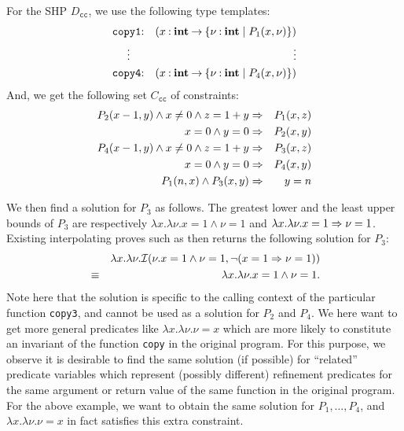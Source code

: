 For the SHP \(D_{\texttt{cc}}\), we use the following type templates:
\begin{eqnarray*}
\texttt{copy1}&\mathbin{:}&(x\mathbin{:}{\mathbf{int}}\mathbin{\rightarrow}{\{{\nu\mathbin{:}\mathbf{int} \mid P_1(x,\nu)}\}}) \\
\vdots\quad &&\qquad\qquad \vdots \\
\texttt{copy4}&\mathbin{:}&(x\mathbin{:}{\mathbf{int}}\mathbin{\rightarrow}{\{{\nu\mathbin{:}\mathbf{int} \mid P_4(x,\nu)}\}})
\end{eqnarray*}
And, we get the following set \(C_{\texttt{cc}}\) of constraints:
\begin{eqnarray*}
P_2(x-1,y) \land x\neq0 \land z=1+y &\Rightarrow& P_1(x,z) \\
x=0 \land y=0 &\Rightarrow& P_2(x,y) \\
P_4(x-1,y) \land x\neq0 \land z=1+y &\Rightarrow& P_3(x,z) \\
x=0 \land y=0 &\Rightarrow& P_4(x,y) \\
P_1(n,x) \land P_3(x,y) &\Rightarrow& y=n
\end{eqnarray*}

We then find a solution for \(P_3\) as follows.  The greatest lower and 
the least upper bounds of \(P_3\) are respectively \(\lambda x.\lambda 
\nu.x=1 \land \nu=1\) and \(\lambda x.\lambda \nu.x=1 \Rightarrow \nu=1\).
%
Existing interpolating proves such as \cite{Beyer2008} then returns the 
following solution for \(P_3\):
\begin{eqnarray*}
&&\lambda x.\lambda \nu.\mathcal{I}(\nu.x=1 \land \nu=1,\neg (x=1 \Rightarrow \nu=1)) \\
&\equiv& \lambda x.\lambda \nu.x=1 \land \nu=1.
\end{eqnarray*}
Note here that the solution is specific to the calling context of the 
particular function \texttt{copy3}, and cannot be used as a solution for 
\(P_2\) and \(P_4\).  We here want to get more general predicates like 
\(\lambda x.\lambda \nu.\nu=x\) which are more likely to constitute an invariant 
of the function \texttt{copy} in the original program.  For this purpose, 
we observe it is desirable to find the same solution (if possible) for 
``related'' predicate variables which represent (possibly different) 
refinement predicates for the same argument or return value of the same 
function in the original program.  For the above example, we want to 
obtain the same solution for \(P_1,\dots,P_4\), and \(\lambda 
x.\lambda \nu.\nu=x\) in fact satisfies this extra constraint.

